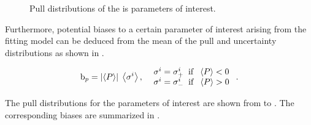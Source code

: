 \begin{figure}[!t]
  \centering
  \begin{subfigure}{0.5\textwidth}
    \raggedright
    \scalebox{0.56}{}
    \caption{}
    \label{pull_ACP0}
  \end{subfigure}%
  \hfill%
  \begin{subfigure}{0.5\textwidth}
    \raggedleft
    \scalebox{0.56}{}
    \caption{}
    \label{pull_ACPperp}
  \end{subfigure}
  \begin{subfigure}{0.5\textwidth}
    \raggedright
    \scalebox{0.56}{}
    \caption{}
    \label{pull_ACPpar}
  \end{subfigure}%
  \hfill%
  \begin{subfigure}{0.5\textwidth}
    \raggedleft
    \scalebox{0.56}{}
    \caption{}
    \label{pull_ACPS}
  \end{subfigure}
\caption{Pull distributions of the \Acp{i} parameters of interest.}
\label{pull_acp}
\end{figure}

Furthermore, potential biases to a certain parameter of interest arising from the fitting model
can be deduced from the mean of the pull and uncertainty distributions as shown in .

\begin{equation}
{\rm b}_p = \left|\left<P\right>\right| \; \left<\sigma^i\right>,\;\; \left.
  \begin{array}{ll}
    \sigma^i = \sigma^i_+ \;\;{\rm if}\;\; \left<P\right> < 0 \\
    \sigma^i = \sigma^i_- \;\;{\rm if}\;\; \left<P\right> > 0
  \end{array} \right. .
\label{bias_def}
\end{equation}

The pull distributions for the parameters of interest are shown from  to .
The corresponding biases are summarized in .

